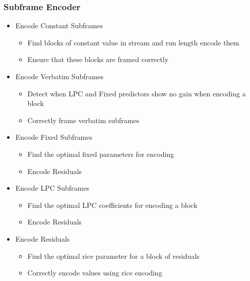 \documentclass[12pt]{scrartcl}
\begin{document}
  \subsubsection{Subframe Encoder}
  \begin{itemize}
  \item Encode Constant Subframes
    \begin{itemize}
    \item Find blocks of constant value in stream and run length encode them
    \item Ensure that these blocks are framed correctly
    \end{itemize}
  \item Encode Verbatim Subframes
    \begin{itemize}
    \item Detect when LPC and Fixed predictors show no gain when encoding a block
    \item Correctly frame verbatim subframes
    \end{itemize}
  \item Encode Fixed Subframes
    \begin{itemize}
    \item Find the optimal fixed parameters for encoding
    \item Encode Residuals
    \end{itemize}
  \item Encode LPC Subframes
    \begin{itemize}
    \item Find the optimal LPC coefficients for encoding a block
    \item Encode Residuals
    \end{itemize}
  \item Encode Residuals
    \begin{itemize}
    \item Find the optimal rice parameter for a block of residuals
    \item Correctly encode values using rice encoding
    \end{itemize}
  \end{itemize}
  
  
  
\end{document}

